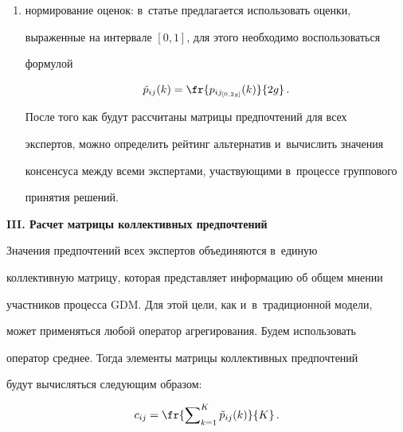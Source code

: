 \begin{enumerate}[(1)]
\begin{center}
  \end{center}




   


  \item  нормирование оценок: в~статье предлагается использовать оценки, 


выраженные на интервале $[0, 1]$, для этого необходимо воспользоваться 


формулой


  \begin{equation*}


  \tilde{p}_{ij}(k)= \fr{p_{ij_{[0,2g]}}(k)}{2g}\,.




  \end{equation*} 


  


  После того как будут рассчитаны матрицы предпочтений для всех 


экспертов, можно определить рейтинг альтернатив и~вычислить значения 


консенсуса между всеми экспертами, участвующими в~процессе группового 


принятия решений.


  \end{enumerate}


  


  \textbf{III. Расчет матрицы коллективных предпочтений}


  


  Значения предпочтений всех экспертов объединяются в~единую 


коллективную матрицу, которая представляет информацию об общем мнении 


участников процесса GDM. Для этой цели, как и~в~традиционной модели, 


может применяться любой оператор агрегирования. Будем использовать 


оператор среднее. Тогда элементы матрицы коллективных предпочтений 


  будут вычисляться следующим образом:


  \begin{equation*}


  c_{ij} =\fr{\sum\nolimits^K_{k=1} \tilde{p}_{ij}(k)}{K}\,.




  \end{equation*}


